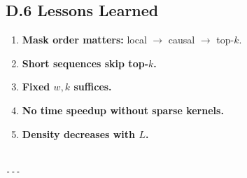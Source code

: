\subsection{D.6 Lessons Learned}

\begin{enumerate}
\item \textbf{Mask order matters:} local $\to$ causal $\to$ top-$k$.
\item \textbf{Short sequences skip top-$k$.}
\item \textbf{Fixed $w, k$ suffices.}
\item \textbf{No time speedup without sparse kernels.}
\item \textbf{Density decreases with $L$.}
\end{enumerate}
\begin{lstlisting}

---
\end{lstlisting}